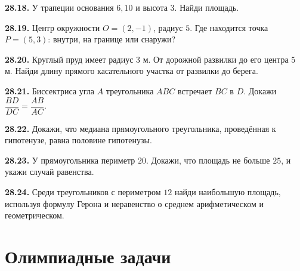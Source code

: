 \noindent\begin{minipage}[t]{\linewidth}\textbf{28.18.} У трапеции основания \(6,10\) и высота \(3\). Найди площадь.\par\end{minipage}\par
\noindent\begin{minipage}[t]{\linewidth}\textbf{28.19.} Центр окружности \(O=(2,-1)\), радиус \(5\). Где находится точка \(P=(5,3)\): внутри, на границе или снаружи?\par\end{minipage}\par
\noindent\begin{minipage}[t]{\linewidth}\textbf{28.20.} Круглый пруд имеет радиус \(3\) м. От дорожной развилки до его центра \(5\) м. Найди длину прямого касательного участка от развилки до берега.\par\end{minipage}\par
\noindent\begin{minipage}[t]{\linewidth}\textbf{28.21.}\starmark{} Биссектриса угла \(A\) треугольника \(ABC\) встречает \(BC\) в \(D\). Докажи \(\dfrac{BD}{DC}=\dfrac{AB}{AC}\).\par\end{minipage}\par
\noindent\begin{minipage}[t]{\linewidth}\textbf{28.22.}\starmark{} Докажи, что медиана прямоугольного треугольника, проведённая к гипотенузе, равна половине гипотенузы.\par\end{minipage}\par
\noindent\begin{minipage}[t]{\linewidth}\textbf{28.23.}\starmark{} У прямоугольника периметр \(20\). Докажи, что площадь не больше \(25\), и укажи случай равенства.\par\end{minipage}\par
\noindent\begin{minipage}[t]{\linewidth}\textbf{28.24.}\starmark{} Среди треугольников с периметром \(12\) найди наибольшую площадь, используя формулу Герона и неравенство о среднем арифметическом и геометрическом.\par\end{minipage}\par
\par{}\section*{Олимпиадные задачи}
